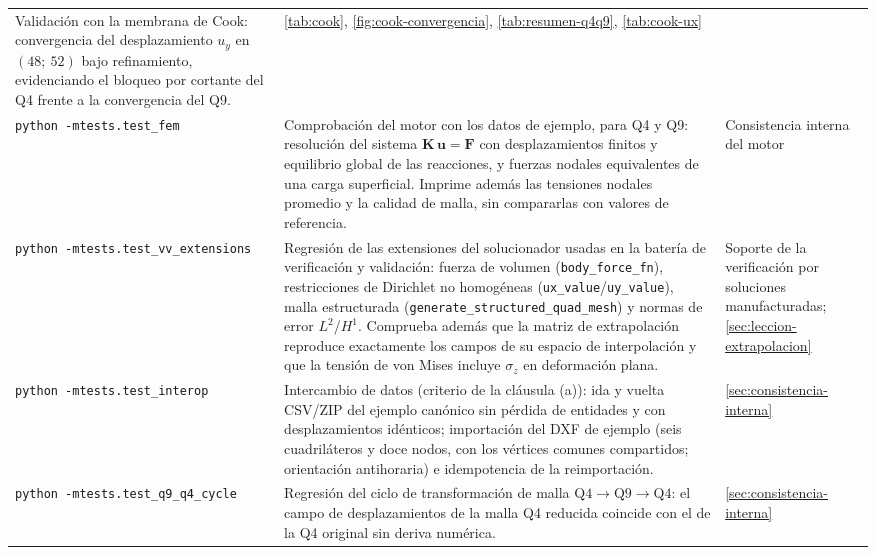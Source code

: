 {\begin{longtable}{@{}>{\footnotesize\raggedright\arraybackslash}p{4.3cm} >{\footnotesize\raggedright\arraybackslash}p{5.1cm} >{\footnotesize\raggedright\arraybackslash}p{4.1cm}@{}}
Validación con la membrana de Cook: convergencia del desplazamiento $u_y$ en $(48;\ 52)$ bajo refinamiento, evidenciando el bloqueo por cortante del Q4 frente a la convergencia del Q9. &
\autoref{tab:cook}, \autoref{fig:cook-convergencia}, \autoref{tab:resumen-q4q9}, \autoref{tab:cook-ux} \\
\addlinespace
\texttt{python -m}\newline\texttt{tests.test\_fem} &
Comprobación del motor con los datos de ejemplo, para Q4 y Q9: resolución del sistema $\bm{K}\,\bm{u}=\bm{F}$ con desplazamientos finitos y equilibrio global de las reacciones, y fuerzas nodales equivalentes de una carga superficial. Imprime además las tensiones nodales promedio y la calidad de malla, sin compararlas con valores de referencia. &
Consistencia interna del motor \\
\addlinespace
\texttt{python -m}\newline\texttt{tests.test\_vv\_extensions} &
Regresión de las extensiones del solucionador usadas en la batería de verificación y validación: fuerza de volumen (\texttt{body\_force\_fn}), restricciones de Dirichlet no homogéneas (\texttt{ux\_value}/\texttt{uy\_value}), malla estructurada (\texttt{generate\_structured\_quad\_mesh}) y normas de error $L^2$/$H^1$. Comprueba además que la matriz de extrapolación reproduce exactamente los campos de su espacio de interpolación y que la tensión de von Mises incluye $\sigma_z$ en deformación plana. &
Soporte de la verificación por soluciones manufacturadas; \autoref{sec:leccion-extrapolacion} \\
\addlinespace
\texttt{python -m}\newline\texttt{tests.test\_interop} &
Intercambio de datos (criterio de la cláusula (a)): ida y vuelta CSV/ZIP del ejemplo canónico sin pérdida de entidades y con desplazamientos idénticos; importación del DXF de ejemplo (seis cuadriláteros y doce nodos, con los vértices comunes compartidos; orientación antihoraria) e idempotencia de la reimportación. &
\autoref{sec:consistencia-interna} \\
\addlinespace
\texttt{python -m}\newline\texttt{tests.test\_q9\_q4\_cycle} &
Regresión del ciclo de transformación de malla $\text{Q4}\rightarrow\text{Q9}\rightarrow\text{Q4}$: el campo de desplazamientos de la malla Q4 reducida coincide con el de la Q4 original sin deriva numérica. &
\autoref{sec:consistencia-interna} \\
\end{longtable}}

